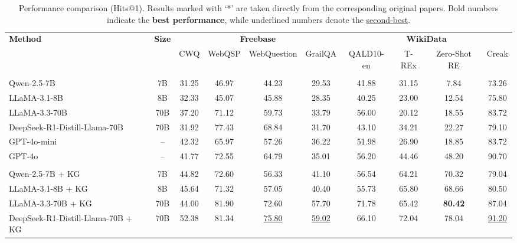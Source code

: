 \documentclass[10pt,conference]{IEEEtran}
\begin{document}
\begin{table}[ht]
\centering
\caption{
Performance comparison (Hits@1). Results marked with `*' are taken directly from the corresponding original papers. 
Bold numbers indicate the \textbf{best performance}, while underlined numbers denote the \underline{second-best}.
}
\centering
\renewcommand{\arraystretch}{1}
\begin{adjustbox}{width=\textwidth}
\begin{tabular}{lccccccccc}
\toprule
\multirow{2}{*}{\textbf{Method}} & \multirow{2}{*}{\textbf{Size}} & \multicolumn{4}{c}{\textbf{Freebase}} & \multicolumn{4}{c}{\textbf{WikiData}} \\
\cmidrule(lr){3-6} \cmidrule(lr){7-10}
 & & CWQ & WebQSP & WebQuestion & GrailQA & QALD10-en & T-REx & Zero-Shot RE & Creak \\
\midrule
\rowcolor{gray!10} \multicolumn{10}{l}{\textbf{LLM Prompting Only}} \\
Qwen-2.5-7B & 7B & 31.25 & 46.97 & 44.23 & 29.53 & 41.88 & 31.15 & 7.84 & 73.26 \\
LLaMA-3.1-8B & 8B & 32.33 & 45.07 & 45.88 & 28.35 & 40.25 & 23.00 & 12.54 & 75.80 \\
LLaMA-3.3-70B & 70B & 37.20 & 71.12 & 59.73 & 33.79 & 56.00 & 20.12 & 18.55 & 83.72 \\
DeepSeek-R1-Distill-Llama-70B & 70B & 31.92 & 77.43 & 68.84 & 31.70 & 43.10 & 34.21 & 22.27 & 79.10 \\
GPT-4o-mini & – & 42.32 & 65.97 & 57.26 & 36.22 & 51.98 & 26.90 & 18.85 & 83.72 \\
GPT-4o & – & 41.77 & 72.55 & 64.79 & 35.01 & 56.20 & 44.46 & 48.20 & 90.70 \\
\midrule
\rowcolor{gray!10}\multicolumn{10}{l}{\textbf{KG-Augmented LLMs without Fine-Tuning}} \\
Qwen-2.5-7B + KG & 7B & 44.82 & 72.60 & 56.33 & 41.10 & 56.54 & 64.21 & 70.32 & 79.04 \\
LLaMA-3.1-8B + KG & 8B & 45.64 & 71.32 & 57.05 & 40.40 & 55.73 & 65.80 & 68.66 & 80.50 \\
LLaMA-3.3-70B + KG & 70B & 44.00 & 81.90 & 72.60 & 57.70 & 71.78 & 65.42 & \textbf{80.42} & 87.04 \\
DeepSeek-R1-Distill-Llama-70B + KG & 70B & 52.38 & 81.34 & \underline{75.80} & \underline{59.02} & 66.10 & 72.04 & 78.04 & \underline{91.20} \\

\end{tabular}
\end{adjustbox}
\end{table}
\end{document}
